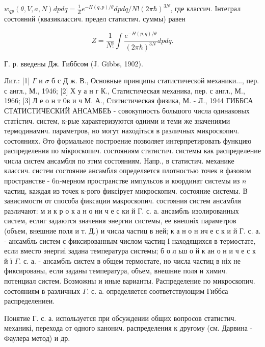 \documentclass[10pt]{article}
\begin{document}
$w_{q p}(\theta, V, a, N) d p d q=\frac{1}{Z} e^{-H(q, p) / \theta} d p d q / N !(2 \pi \hbar)^{3 N}$, где классич. Інтеграл состояний (квазиклассич. предел статистич. суммы) равен



\[

Z=\frac{1}{N !} \int \frac{e^{-H(p, q) / \theta}}{(2 \pi \hbar)^{3 N}} d p d q .

\]



Г. р. введены Дж. Гиббсом (J. Gibbs, 1902).



Лит.: [1] $\Gamma$ и $\sigma$ б с Д ж. В., Основные принципы статистической механики..., пер. с англ., М., 1946; [2] Х у а н г К., Статистическая механика, пер. с англ., М., 1966; [3] Л е о н т 0в и ч М. А., Статистическая физика, М. - Л., 1944 ГИББСА СТАТИСТИЧЕСКИЙ АНСАМБЕЬ - совокупность большого числа одинаковых статістич. систем, к-рые характеризуются одними и теми же значениями термодинамич. параметров, но могут находіться в различных микроскопич. состояниях. Әто формальное построение позволяет интерпретировать функцию распределения по мікроскопич. состояниям статистич. системы как распределение числа систем ансамбля по этим состояниям. Напр., в статистич. механике классич. систем состояние ансамбля определяется плотностью точек в фазовом пространстве - 6n-мерном пространстве импульсов и координат системы из $n$ частиц, каждая из точек к-рого фиксірует микроскопич. состояние системы. В зависимости от способа фиксации макроскопич. состояния систем ансамбля различают: м и к р о к а н о ни ч е с ки й Г. с. а. ансамбль изолированных систем, еслиг задаются значения энергии системы, ее внешніх параметров (объем, внешние поля и т. Д.) и числа частиц в ней; к а н о н ич е с к и й Г. с. а. - ансамбль систем с фиксированным числом частиц І находящихся в термостате, если вместо энергиі задана температура системы; б о л ьш о й к ан о н и ч е с к й ї $\Gamma$. с. а. - ансамбль систем в общем термостате, но числа частиц в ніх не фиксированы, если заданы температура, объем, внешние поля и химич. потенциал систем. Возможны и иные варианты. Распределение по микроскопич. состояниям в различных $\Gamma$. с. а. определяется соответствующим Гиббса распределениеи.



Понятие Г. с. а. используется при обсуждении общих вопросов статистич. механикі, перехода от одного канонич. распределения к другому (см. Дарвина - Фаулера метод) и др.
\end{document}

